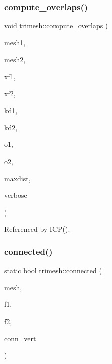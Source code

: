 \subsubsection{\texorpdfstring{compute\+\_\+overlaps()}{compute\_overlaps()}\hspace{0.1cm}{\footnotesize\ttfamily [2/2]}}
{\footnotesize\ttfamily \hyperlink{namespacetrimesh_a784ddfd979e1c579bda795a8edfc3f43}{void} trimesh\+::compute\+\_\+overlaps (\begin{DoxyParamCaption}\item[{\hyperlink{classtrimesh_1_1TriMesh}{Tri\+Mesh} $\ast$}]{mesh1,  }\item[{\hyperlink{classtrimesh_1_1TriMesh}{Tri\+Mesh} $\ast$}]{mesh2,  }\item[{const \hyperlink{namespacetrimesh_ad504958f2f56e393991b848986a8459f}{xform} \&}]{xf1,  }\item[{const \hyperlink{namespacetrimesh_ad504958f2f56e393991b848986a8459f}{xform} \&}]{xf2,  }\item[{const \hyperlink{classtrimesh_1_1KDtree}{K\+Dtree} $\ast$}]{kd1,  }\item[{const \hyperlink{classtrimesh_1_1KDtree}{K\+Dtree} $\ast$}]{kd2,  }\item[{vector$<$ float $>$ \&}]{o1,  }\item[{vector$<$ float $>$ \&}]{o2,  }\item[{float}]{maxdist,  }\item[{int}]{verbose }\end{DoxyParamCaption})}



Referenced by I\+C\+P().

\mbox{\label{namespacetrimesh_a3271092693bfaae6670439f9a896eeca}} 
\subsubsection{\texorpdfstring{connected()}{connected()}}
{\footnotesize\ttfamily static bool trimesh\+::connected (\begin{DoxyParamCaption}\item[{const \hyperlink{classtrimesh_1_1TriMesh}{Tri\+Mesh} $\ast$}]{mesh,  }\item[{int}]{f1,  }\item[{int}]{f2,  }\item[{bool}]{conn\+\_\+vert }\end{DoxyParamCaption})\hspace{0.3cm}{\ttfamily [static]}}



